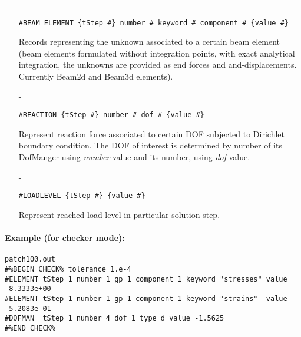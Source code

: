 \documentclass[a4paper]{article}
\begin{document}
\begin{itemize}
\item[-]
\begin{verbatim}
#BEAM_ELEMENT {tStep #} number # keyword # component # {value #}
\end{verbatim}
Records representing the unknown associated to a certain beam
element (beam elements formulated without integration points, with
exact analytical integration, the unknowns are provided as end forces
and and-displacements. Currently Beam2d and Beam3d elements). 

\item[-]
\begin{verbatim}
#REACTION {tStep #} number # dof # {value #}
\end{verbatim}
Represent reaction force associated to certain DOF subjected to Dirichlet boundary condition.
The DOF of interest is determined by number of its DofManger 
using {\em number} value and its number, using {\em dof} value.

\item[-]
\begin{verbatim}
#LOADLEVEL {tStep #} {value #}
\end{verbatim}
Represent reached load level in particular solution step.
\end{itemize}

\paragraph{Example (for checker mode):}
\begin{verbatim}
patch100.out
#%BEGIN_CHECK% tolerance 1.e-4
#ELEMENT tStep 1 number 1 gp 1 component 1 keyword "stresses" value -8.3333e+00
#ELEMENT tStep 1 number 1 gp 1 component 1 keyword "strains"  value -5.2083e-01
#DOFMAN  tStep 1 number 4 dof 1 type d value -1.5625
#%END_CHECK%
\end{verbatim}
\end{document}
